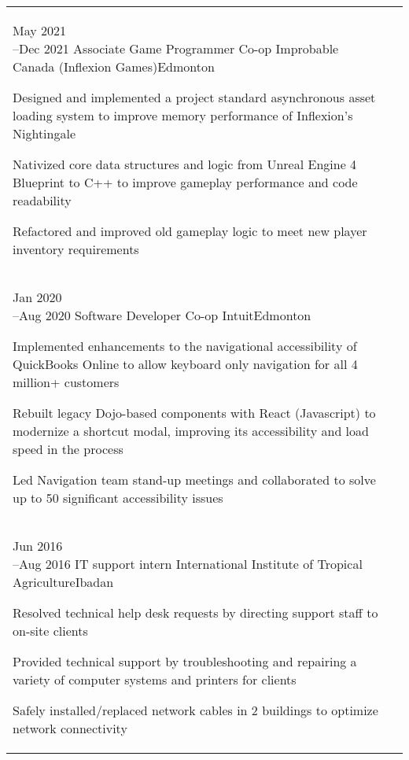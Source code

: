 \documentclass[a4paper]{modernsimplecv}
\begin{document}
\begin{paracol}{2}
\begin{minipage}[t]{\rightcolwidth}
\begin{tabular}{@{\raggedright}p{} |>{\raggedright\arraybackslash}p{}}
			\cvevent{May 2021\newline --Dec 2021}
                {Associate Game Programmer Co-op}
                {Improbable Canada (Inflexion Games)}{Edmonton}
                {\begin{tabitemize}
                    \item Designed and implemented a project standard asynchronous asset loading system to improve memory performance of Inflexion's Nightingale
                    \item Nativized core data structures and logic from Unreal Engine 4 Blueprint to C++ to improve gameplay performance and code readability
                    \item Refactored and improved old gameplay logic to meet new player inventory requirements
                \end{tabitemize}   
                }\\
            \cvevent{Jan 2020\newline --Aug 2020}
                {Software Developer Co-op}
                {Intuit}{Edmonton}
                {\begin{tabitemize}
                    \item Implemented enhancements to the navigational accessibility of QuickBooks Online to allow keyboard only navigation for all 4 million+ customers
                    \item Rebuilt legacy Dojo-based components with React (Javascript) to modernize a shortcut modal, improving its accessibility and load speed in the process
                    \item Led Navigation team stand-up meetings and collaborated to solve up to 50 significant accessibility issues
                \end{tabitemize}   
                }\\ 
            \cvevent{Jun 2016\newline --Aug 2016}
                {IT support intern}
                {International Institute of Tropical Agriculture}{Ibadan}
                {\begin{tabitemize}
                    \item Resolved technical help desk requests by directing support staff to on-site clients
                    \item Provided technical support by troubleshooting and repairing a variety of computer systems and printers for clients
                    \item Safely installed/replaced network cables in 2 buildings to optimize network connectivity
                \end{tabitemize}
                \vspace{-\baselineskip}\mbox{}
                }
        \end{tabular}
        \vspace{1em}
	\end{minipage}
    

\end{paracol}
\end{document}
